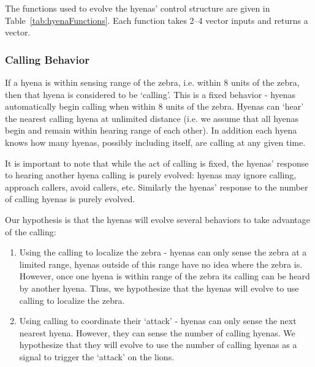 \documentclass{article}
\begin{document}
The functions used to evolve the hyenas' control structure are given in Table~\ref{tab:hyenaFunctions}.  Each function takes 2--4 vector inputs and returns a vector. 

\subsubsection{Calling Behavior}

If a hyena is within sensing range of the zebra, i.e. within 8 units of the zebra, then that hyena is considered to be `calling'.  This is a fixed behavior - hyenas automatically begin calling when within 8 units of the zebra.  Hyenas can `hear' the nearest calling hyena at unlimited distance (i.e. we assume that all hyenas begin and remain within hearing range of each other).  In addition each hyena knows how many hyenas, possibly including itself, are calling at any given time.  

It is important to note that while the act of calling is fixed, the hyenas' response to hearing another hyena calling is purely evolved: hyenas may ignore calling, approach callers, avoid callers, etc.  Similarly the hyenas' response to the number of calling hyenas is purely evolved.

Our hypothesis is that the hyenas will evolve several behaviors to take advantage of the calling:
\begin{enumerate}
    \item Using the calling to localize the zebra - hyenas can only sense the zebra at a limited range, hyenas outside of this range have no idea where the zebra is.  However, once one hyena is within range of the zebra its calling can be heard by another hyena.  Thus, we hypothesize that the hyenas will evolve to use calling to localize the zebra.
\item Using calling to coordinate their `attack' - hyenas can only sense the next nearest hyena.  However, they can sense the number of calling hyenas.  We hypothesize that they will evolve to use the number of calling hyenas as a signal to trigger the `attack' on the lions.
\end{enumerate}
\end{document}
